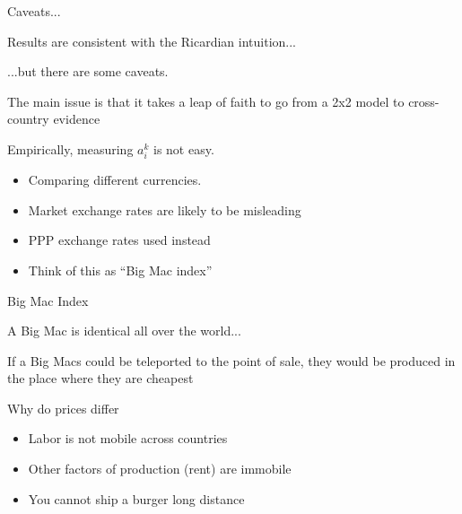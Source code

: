 \documentclass[notes,11pt, aspectratio=169, xcolor=table]{beamer}
\newenvironment{wideitemize}{\itemize\addtolength{\itemsep}{10pt}}{\enditemize}
\begin{document}
\begin{frame}{Caveats...}
\begin{wideitemize}
    \item Results are consistent with the Ricardian intuition...

    \item ...but there are some caveats.

    \item The main issue is that it takes a leap of faith to go from a 2x2 model to cross-country evidence

    \item<2-> Empirically, measuring $a_i^k$ is not easy.

    \begin{itemize}
        \item<2-> Comparing different currencies.
        \item<3-> Market exchange rates are likely to be misleading
        \item<4-> PPP exchange rates  used instead
        \item<5-> Think of this as ``Big Mac index''
    \end{itemize}
\end{wideitemize}

\end{frame}

\begin{frame}{Big Mac Index}
    \begin{wideitemize}
        \item A Big Mac is identical all over the world... \vspace{10pt}
        \begin{center}
        \end{center}

        \item<3-> If a Big Macs could be teleported to the point of sale, they would be produced in the place where they are cheapest

        \item<4-> Why do prices differ
        \begin{itemize}
            \item Labor is not mobile across countries
            \item Other factors of production (rent) are immobile
            \item You cannot ship a burger long distance
        \end{itemize}

    \end{wideitemize}
\end{frame}
\end{document}
